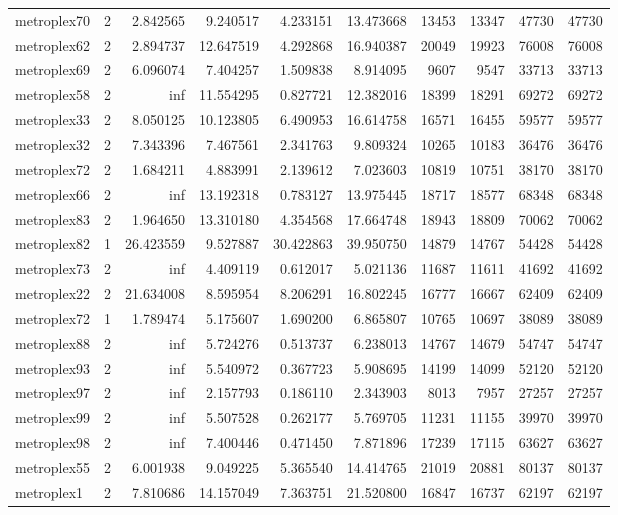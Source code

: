 \begin{longtable}{|l|r|r|r|r|r|r|r|r|r|}
metroplex70 & 2 & 2.842565 & 9.240517 & 4.233151 & 13.473668 & 13453 & 13347 & 47730 & 47730 \\
metroplex62 & 2 & 2.894737 & 12.647519 & 4.292868 & 16.940387 & 20049 & 19923 & 76008 & 76008 \\
metroplex69 & 2 & 6.096074 & 7.404257 & 1.509838 & 8.914095 & 9607 & 9547 & 33713 & 33713 \\
metroplex58 & 2 & inf & 11.554295 & 0.827721 & 12.382016 & 18399 & 18291 & 69272 & 69272 \\
metroplex33 & 2 & 8.050125 & 10.123805 & 6.490953 & 16.614758 & 16571 & 16455 & 59577 & 59577 \\
metroplex32 & 2 & 7.343396 & 7.467561 & 2.341763 & 9.809324 & 10265 & 10183 & 36476 & 36476 \\
metroplex72 & 2 & 1.684211 & 4.883991 & 2.139612 & 7.023603 & 10819 & 10751 & 38170 & 38170 \\
metroplex66 & 2 & inf & 13.192318 & 0.783127 & 13.975445 & 18717 & 18577 & 68348 & 68348 \\
metroplex83 & 2 & 1.964650 & 13.310180 & 4.354568 & 17.664748 & 18943 & 18809 & 70062 & 70062 \\
metroplex82 & 1 & 26.423559 & 9.527887 & 30.422863 & 39.950750 & 14879 & 14767 & 54428 & 54428 \\
metroplex73 & 2 & inf & 4.409119 & 0.612017 & 5.021136 & 11687 & 11611 & 41692 & 41692 \\
metroplex22 & 2 & 21.634008 & 8.595954 & 8.206291 & 16.802245 & 16777 & 16667 & 62409 & 62409 \\
metroplex72 & 1 & 1.789474 & 5.175607 & 1.690200 & 6.865807 & 10765 & 10697 & 38089 & 38089 \\
metroplex88 & 2 & inf & 5.724276 & 0.513737 & 6.238013 & 14767 & 14679 & 54747 & 54747 \\
metroplex93 & 2 & inf & 5.540972 & 0.367723 & 5.908695 & 14199 & 14099 & 52120 & 52120 \\
metroplex97 & 2 & inf & 2.157793 & 0.186110 & 2.343903 & 8013 & 7957 & 27257 & 27257 \\
metroplex99 & 2 & inf & 5.507528 & 0.262177 & 5.769705 & 11231 & 11155 & 39970 & 39970 \\
metroplex98 & 2 & inf & 7.400446 & 0.471450 & 7.871896 & 17239 & 17115 & 63627 & 63627 \\
metroplex55 & 2 & 6.001938 & 9.049225 & 5.365540 & 14.414765 & 21019 & 20881 & 80137 & 80137 \\
metroplex1 & 2 & 7.810686 & 14.157049 & 7.363751 & 21.520800 & 16847 & 16737 & 62197 & 62197 \\

\end{longtable}
